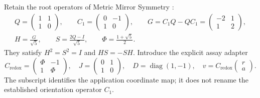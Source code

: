 \documentclass[11pt]{article}
\newcommand{\Id}{I}
\newcommand{\Cr}{C_{\mathrm{redox}}}
\begin{document}
Retain the root operators of Metric Mirror Symmetry \cite{metric}:
\begin{equation}\label{eq:root}
\begin{gathered}
 Q=\begin{pmatrix}1&1\\1&0\end{pmatrix},\qquad
 C_1=\begin{pmatrix}0&-1\\1&0\end{pmatrix},\qquad
 G=C_1Q-QC_1=\begin{pmatrix}-2&1\\1&2\end{pmatrix},\\
 H=\frac G{\sqrt5},\qquad S=\frac{2Q-\Id}{\sqrt5},\qquad
 \Phi=\frac{1+\sqrt5}{2}.
\end{gathered}
\end{equation}
They satisfy \(H^2=S^2=\Id\) and \(HS=-SH\).
Introduce the explicit assay adapter
\begin{equation}\label{eq:C}
 \Cr=\begin{pmatrix}\Phi&-1\\1&\Phi\end{pmatrix},
 \quad J=\begin{pmatrix}0&1\\1&0\end{pmatrix},
 \quad D=\operatorname{diag}(1,-1),
 \quad v=\Cr\begin{pmatrix}r\\a\end{pmatrix}.
\end{equation}
The subscript identifies the application coordinate map; it does not rename
the established orientation operator \(C_1\).
\end{document}
